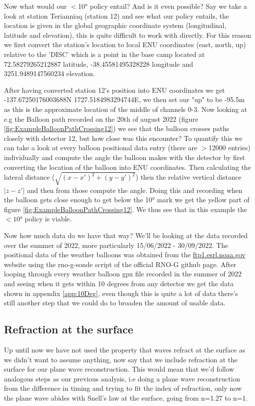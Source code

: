 Now what would our $<$10° policy entail? And is it even possible?  Say we take
a look at station Terianniaq (station 12) and see what our policy entails,
the location is given in the global geographic
coordinate system (longitudinal, latitude and elevation), this is quite
difficult to work with directly. For this reason we first convert the station's location to 
local ENU coordinates (east, north, up) relative to the 'DISC' which is a point in the base camp located at
72.58279265212887 latitude, -38.45581495328228 longitude and 3251.9489147560234 elevation.  

After having converted station 12's position into ENU coordinates we get
-137.67250176003688N 1727.5184983294744E, we then set our "up" to be -95.5m as
this is the approximate location of the middle of channels 0-3.  Now looking at
e.g the Balloon path recorded on the 20th of august 2022 (figure
\ref{fig:ExampleBalloonPathCrossing12}) we see that the balloon crosses paths
closely with detector 12, but how close was this encounter? To quantify this we
can take a look at every balloon positional data entry (there are $>$12000
entries) individually and compute the angle the balloon makes with the detector
by first converting the location of the balloon into ENU coordinates. Then
calculating the lateral distance ($\sqrt{(x-x')^2 + (y-y')^2}$) then the
relative vertical distance $|z - z'|$ and then from those compute the angle. Doing this and recording when the balloon
gets close enough to get below the 10° mark we get the yellow part of figure
\ref{fig:ExampleBalloonPathCrossing12}. We thus see that in this
example the $<10$° policy is viable.

Now how much data do we have that way? 
We'll be looking at the data recorded over the summer of
2022, more particularly 15/06/2022 - 30/09/2022.
The positional data of the weather balloons was obtained from the
\url{ftp1.esrl.noaa.gov} website using the rno-g-sonde script of the official
RNO-G github page. After looping through every weather
balloon gpx file recorded in the summer of 2022 and seeing when it gets
within 10 degrees from any detector we get the data shown in appendix \ref{app:10Deg}, even
though this is quite a lot of data there's still another step that we could do
to broaden the amount of usable data.
\subsection{Refraction at the surface}
Up until now we have not used the property that waves refract at the surface as
we didn't want to assume anything, now say that we include refraction at the
surface for our plane wave reconstruction. This would mean that we'd follow
analogous steps as our previous analysis, i.e doing a plane wave reconstruction
from the difference in timing and trying to fit the index of refraction, only
now the plane wave abides with Snell's law at the surface, going from n=1.27 to
n=1. 


